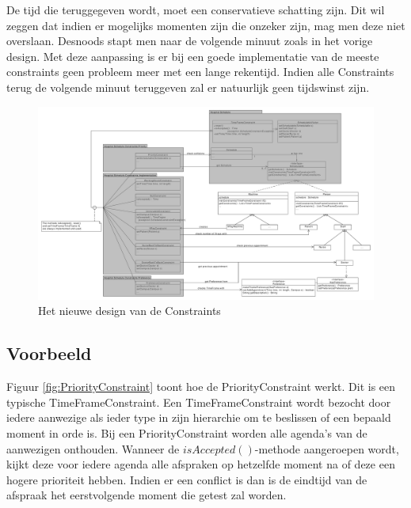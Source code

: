 De tijd die teruggegeven wordt, moet een conservatieve schatting zijn. 
Dit wil zeggen dat indien er mogelijks momenten zijn die onzeker zijn, mag men deze niet overslaan. 
Desnoods stapt men naar de volgende minuut zoals in het vorige design. 
Met deze aanpassing is er bij een goede implementatie van de meeste constraints geen probleem meer met een lange rekentijd. 
Indien alle Constraints terug de volgende minuut teruggeven zal er natuurlijk geen tijdswinst zijn. 
\begin{figure}
\vspace{-2cm}
  \begin{center}
    \includegraphics[width=1.0\textheight,angle=270]{./exported/Constraints.pdf}
  \end{center}
  \caption{Het nieuwe design van de Constraints\label{fig:Constraints}}
\vspace{2cm}
\end{figure} 

\subsection{Voorbeeld}
Figuur \ref{fig:PriorityConstraint} toont hoe de PriorityConstraint werkt. Dit is een typische TimeFrameConstraint. 
Een TimeFrameConstraint wordt bezocht door iedere aanwezige als ieder type in zijn hierarchie om te beslissen of een bepaald moment in orde is. 
Bij een PriorityConstraint worden alle agenda's van de aanwezigen onthouden. 
Wanneer de $isAccepted()$-methode aangeroepen wordt, kijkt deze voor iedere agenda alle afspraken op hetzelfde moment na of deze een hogere prioriteit hebben. 
Indien er een conflict is dan is de eindtijd van de afspraak het eerstvolgende moment die getest zal worden. \\

